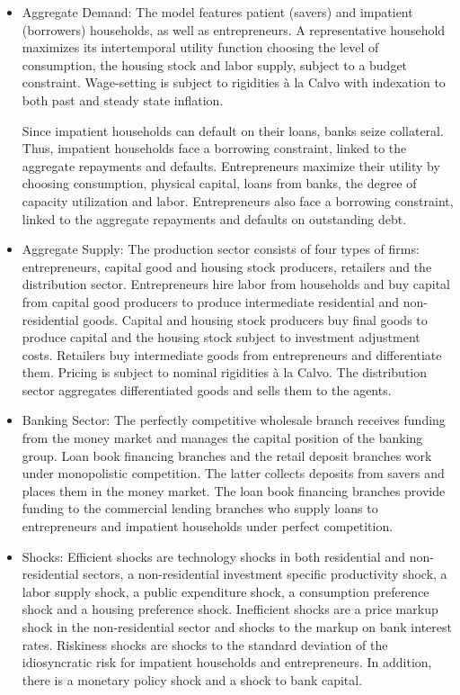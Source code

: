 \documentclass[11pt,a4paper]{article}
\begin{document}
	\begin{itemize}
		\item Aggregate Demand: The model features  patient (savers) and impatient (borrowers) households, as well as entrepreneurs. A representative household maximizes its intertemporal utility function choosing the level of consumption, the housing stock and labor supply, subject to a budget constraint. Wage-setting is subject to rigidities \`{a} la Calvo with indexation to both past and steady state inflation.
		
		Since impatient households can default on their loans, banks seize collateral. Thus, impatient households face a borrowing constraint, linked to the aggregate repayments and defaults.  Entrepreneurs maximize their utility by choosing consumption, physical capital, loans from banks, the degree of capacity utilization and labor. Entrepreneurs also face a borrowing constraint, linked to the aggregate repayments and defaults on outstanding debt.
		\item Aggregate Supply: The production sector consists of four types of firms: entrepreneurs, capital good and housing stock producers, retailers and the distribution sector. Entrepreneurs hire labor from households and buy capital from capital good producers to produce intermediate residential and non-residential goods. Capital and housing stock producers buy final goods to produce capital and the housing stock subject to investment adjustment costs. Retailers buy intermediate goods from entrepreneurs and differentiate them. Pricing is subject to nominal rigidities \`{a} la Calvo. The distribution sector aggregates differentiated goods and sells them to the agents.
		\item Banking Sector: The perfectly competitive wholesale branch receives funding from the money market and manages the capital position of the banking group. Loan book financing branches and the retail deposit branches work under monopolistic competition. The latter collects deposits from savers and places them in the money market. The loan book financing branches provide funding to the commercial lending branches who supply loans to entrepreneurs and impatient households under perfect competition.
		\item Shocks: Efficient shocks are technology shocks in both residential and non-residential sectors, a non-residential investment specific productivity shock, a labor supply shock, a public expenditure shock, a consumption preference shock and a housing preference shock. Inefficient shocks are a price markup shock in the non-residential sector and shocks to the markup on bank interest rates. Riskiness shocks are shocks to the standard deviation of the idiosyncratic risk for impatient households and entrepreneurs. In addition, there is a monetary policy shock and a shock to bank capital.

\end{itemize}
\end{document}
